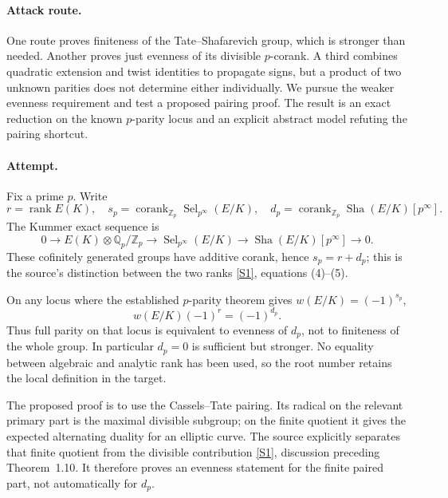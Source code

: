 \documentclass[11pt,a4paper]{article}
\newcommand{\Z}{\mathbb{Z}}
\newcommand{\Q}{\mathbb{Q}}
\newcommand{\sref}[2]{\hyperlink{source:#1:#2}{[S#2]}}
\numberwithin{equation}{section}
\begin{document}
\paragraph{Attack route.}
One route proves finiteness of the Tate--Shafarevich group, which is stronger than needed. Another proves just evenness of its divisible $p$-corank. A third combines quadratic extension and twist identities to propagate signs, but a product of two unknown parities does not determine either individually. We pursue the weaker evenness requirement and test a proposed pairing proof. The result is an exact reduction on the known $p$-parity locus and an explicit abstract model refuting the pairing shortcut.

\paragraph{Attempt.}
Fix a prime $p$. Write
\[
 r=\operatorname{rank}E(K),\quad s_p=\operatorname{corank}_{\Z_p}
       \operatorname{Sel}_{p^\infty}(E/K),\quad
 d_p=\operatorname{corank}_{\Z_p}\operatorname{Sha}(E/K)[p^\infty].
\]
The Kummer exact sequence is
\begin{equation}\label{eq196:selmer}
 0\longrightarrow E(K)\otimes\Q_p/\Z_p
 \longrightarrow\operatorname{Sel}_{p^\infty}(E/K)
 \longrightarrow\operatorname{Sha}(E/K)[p^\infty]\longrightarrow0.
\end{equation}
These cofinitely generated groups have additive corank, hence $s_p=r+d_p$; this is the source's distinction between the two ranks \sref{30006786}{1}, equations (4)--(5).

On any locus where the established $p$-parity theorem gives $w(E/K)=(-1)^{s_p}$,
\begin{equation}\label{eq196:defect}
 w(E/K)(-1)^r=(-1)^{d_p}.
\end{equation}
Thus full parity on that locus is equivalent to evenness of $d_p$, not to finiteness of the whole group. In particular $d_p=0$ is sufficient but stronger. No equality between algebraic and analytic rank has been used, so the root number retains the local definition in the target.

The proposed proof is to use the Cassels--Tate pairing. Its radical on the relevant primary part is the maximal divisible subgroup; on the finite quotient it gives the expected alternating duality for an elliptic curve. The source explicitly separates that finite quotient from the divisible contribution \sref{30006786}{1}, discussion preceding Theorem~1.10. It therefore proves an evenness statement for the finite paired part, not automatically for $d_p$.
\end{document}
